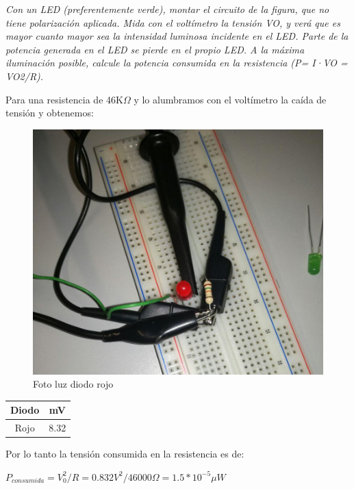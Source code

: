 \documentclass[paper=a4, fontsize=11pt]{scrartcl} %
\numberwithin{equation}{section} %
\numberwithin{figure}{section} %
\numberwithin{table}{section} %
\begin{document}
\textit{Con un LED (preferentemente verde), montar el circuito de la figura, que no tiene polarización aplicada. Mida con el voltímetro la tensión VO, y verá que es mayor cuanto mayor sea la intensidad luminosa incidente en el LED. Parte de la potencia generada en el LED se pierde en el propio LED. A la máxima iluminación posible, calcule la potencia consumida en la resistencia (P= I·VO = VO2/R).} \newline

Para una resistencia de 46K$ \Omega $ y lo alumbramos con el voltímetro la caída de tensión y obtenemos:

\begin{figure}[H]
	\centering
	\includegraphics[scale=0.4]{image/lex-diodo}
	\caption{Foto luz diodo rojo}
	\label{fig:lex-diodo-rojo}
\end{figure}

\begin{table}[H]
	\centering
	\begin{tabular}{|c|c|}
		\hline
			Diodo & mV \\
		\hline
			Rojo & 8.32 \\
		\hline
	\end{tabular}
\end{table}

Por lo tanto la tensión consumida en la resistencia es de: \newline

$ P_{consumida} = V_{0}^{2} / R = 0.832V^{2} / 46000 \Omega = 1.5 * 10^{-5} \mu W $ \newline
\end{document}
